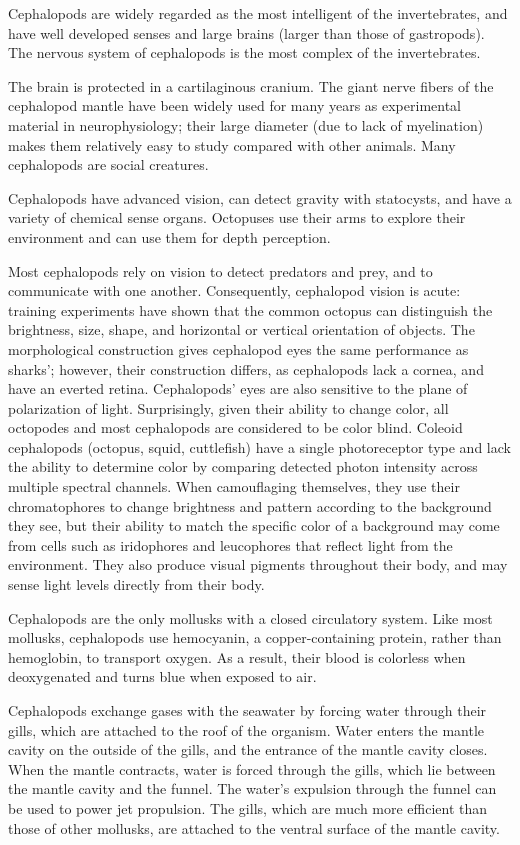 \documentclass[]{book}
\begin{document}
Cephalopods are widely regarded as the most intelligent of the invertebrates, and have well developed senses and large brains (larger than those of gastropods). The nervous system of cephalopods is the most complex of the invertebrates.

The brain is protected in a cartilaginous cranium. The giant nerve fibers of the cephalopod mantle have been widely used for many years as experimental material in neurophysiology; their large diameter (due to lack of myelination) makes them relatively easy to study compared with other animals. Many cephalopods are social creatures.

Cephalopods have advanced vision, can detect gravity with statocysts, and have a variety of chemical sense organs. Octopuses use their arms to explore their environment and can use them for depth perception.

Most cephalopods rely on vision to detect predators and prey, and to communicate with one another. Consequently, cephalopod vision is acute: training experiments have shown that the common octopus can distinguish the brightness, size, shape, and horizontal or vertical orientation of objects. The morphological construction gives cephalopod eyes the same performance as sharks'; however, their construction differs, as cephalopods lack a cornea, and have an everted retina. Cephalopods' eyes are also sensitive to the plane of polarization of light. Surprisingly, given their ability to change color, all octopodes and most cephalopods are considered to be color blind. Coleoid cephalopods (octopus, squid, cuttlefish) have a single photoreceptor type and lack the ability to determine color by comparing detected photon intensity across multiple spectral channels. When camouflaging themselves, they use their chromatophores to change brightness and pattern according to the background they see, but their ability to match the specific color of a background may come from cells such as iridophores and leucophores that reflect light from the environment. They also produce visual pigments throughout their body, and may sense light levels directly from their body.

Cephalopods are the only mollusks with a closed circulatory system. Like most mollusks, cephalopods use hemocyanin, a copper-containing protein, rather than hemoglobin, to transport oxygen. As a result, their blood is colorless when deoxygenated and turns blue when exposed to air.

Cephalopods exchange gases with the seawater by forcing water through their gills, which are attached to the roof of the organism. Water enters the mantle cavity on the outside of the gills, and the entrance of the mantle cavity closes. When the mantle contracts, water is forced through the gills, which lie between the mantle cavity and the funnel. The water's expulsion through the funnel can be used to power jet propulsion. The gills, which are much more efficient than those of other mollusks, are attached to the ventral surface of the mantle cavity.
\end{document}
